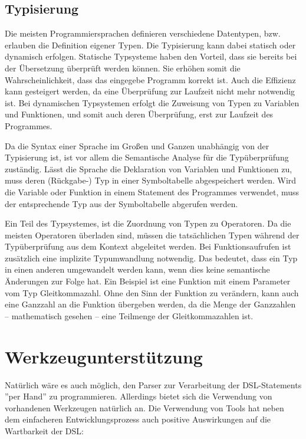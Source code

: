 \section{Typisierung}

Die meisten Programmiersprachen definieren verschiedene Datentypen, bzw. erlauben die Definition eigener Typen. Die Typisierung kann dabei statisch oder dynamisch erfolgen. Statische Typsysteme haben den Vorteil, dass sie bereits bei der Übersetzung überprüft werden können. Sie erhöhen somit die Wahrscheinlichkeit, dass das eingegebe Programm korrekt ist. Auch die Effizienz kann gesteigert werden, da eine Überprüfung zur Laufzeit nicht mehr not\-wen\-dig ist. Bei dynamischen Typsystemen erfolgt die Zuweisung von Typen zu Variablen und Funktionen, und somit auch deren Überprüfung, erst zur Laufzeit des Programmes.

Da die Syntax einer Sprache im Großen und Ganzen unabhängig von der Typisierung ist, ist vor allem die Semantische Analyse für die Typ\-über\-prü\-fung zuständig. Lässt die Sprache die Deklaration von Variablen und Funktionen zu, muss deren (Rückgabe-) Typ in einer Symboltabelle abgespeichert werden. Wird die Variable oder Funktion in einem Statement des Programmes verwendet, muss der ent\-sprech\-ende Typ aus der Symboltabelle abgerufen werden.

Ein Teil des Typsystemes, ist die Zuordnung von Typen zu Operatoren. Da die meisten Operatoren überladen sind, müssen die tatsächlichen Typen während der Typ\-über\-prü\-fung aus dem Kontext abgeleitet werden. Bei Funktionsaufrufen ist zusätzlich eine implizite Typumwandlung not\-wen\-dig. Das bedeutet, dass ein Typ in einen anderen umgewandelt werden kann, wenn dies keine semantische Än\-der\-ung\-en zur Folge hat. Ein Beispiel ist eine Funktion mit einem Parameter vom Typ Gleitkommazahl. Ohne den Sinn der Funktion zu verändern, kann auch eine Ganzzahl an die Funktion übergeben werden, da die Menge der Ganzzahlen -- mathematisch gesehen -- eine Teilmenge der Gleitkommazahlen ist.


\chapter{Werkzeugunterstützung}
\label{chapter_tools}

Natürlich wäre es auch möglich, den Parser zur Verarbeitung der DSL-Statements ''per Hand'' zu programmieren. Allerdings bietet sich die Verwendung von vorhandenen Werkzeugen natürlich an. Die Verwendung von Tools hat neben dem einfacheren Entwicklungsprozess auch positive Aus\-wir\-kun\-gen auf die Wartbarkeit der DSL:

